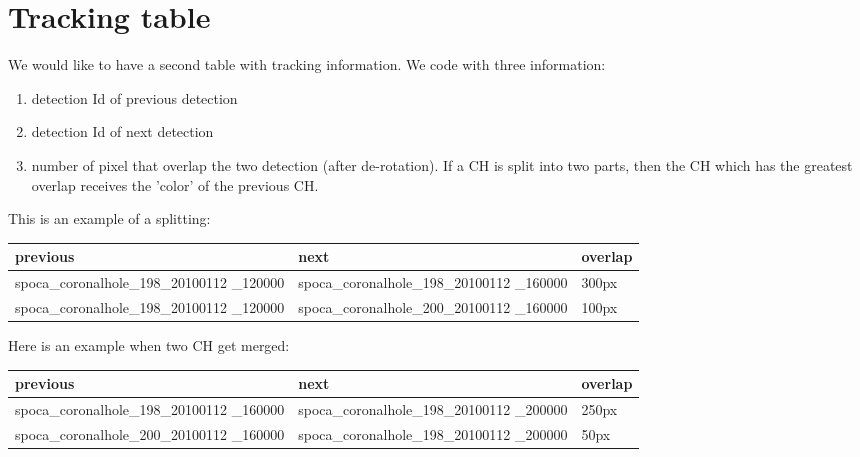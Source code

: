 \documentclass{article}
\begin{document}
\newpage
\section{Tracking table}

We would like to have a second table with tracking information. We code with three information:
\begin{enumerate}
\item detection Id of previous detection
\item detection Id of next detection
\item number of pixel that overlap the two detection (after de-rotation). If a CH is split into two parts, then the CH which has the greatest overlap receives the 'color' of the previous CH.
\end{enumerate}

This is an example of a splitting:

\begin{table} [h]
  \begin{tabular}{|p{6cm}|p{6cm}|p{1.5cm}|}
\hline
previous   & next &   overlap\\
\hline \hline
spoca\_coronalhole\_198\_20100112 \_120000&
spoca\_coronalhole\_198\_20100112 \_160000 &300px \\ \hline
spoca\_coronalhole\_198\_20100112 \_120000&
spoca\_coronalhole\_200\_20100112 \_160000 &100px \\ \hline
\end{tabular}
\end{table}


Here is an example when two CH get merged:

\begin{table} [h]
  \begin{tabular}{|p{6cm}|p{6cm}|p{1.5cm}|}
\hline
\hline
previous   & next &   overlap\\ \hline \hline
spoca\_coronalhole\_198\_20100112 \_160000 &
spoca\_coronalhole\_198\_20100112 \_200000 &250px\\ \hline
spoca\_coronalhole\_200\_20100112 \_160000 &
spoca\_coronalhole\_198\_20100112 \_200000 & 50px \\ \hline
\end{tabular}
\end{table}
\end{document}
